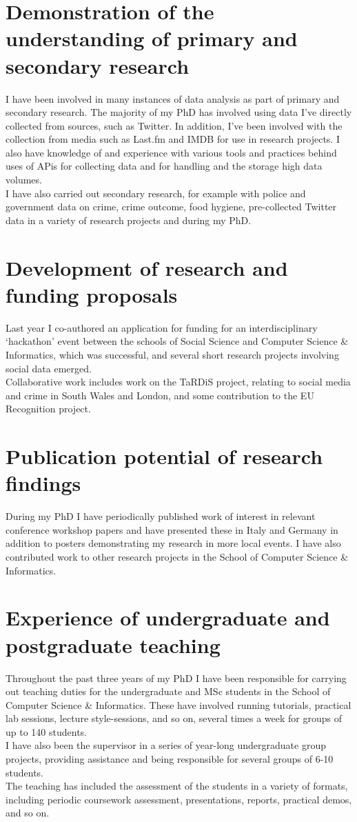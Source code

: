 \documentclass[10pt,a4paper]{article}
\begin{document}
\section*{Demonstration of the understanding of primary and secondary research}
I have been involved in many instances of data analysis as part of primary and secondary research. The majority of my PhD has involved using data I've directly collected from sources, such as Twitter. In addition, I've been involved with the collection from media such as Last.fm and IMDB for use in research projects. I also have knowledge of and experience with various tools and practices behind uses of APis for collecting data and for handling and the storage high data volumes.\\
I have also carried out secondary research, for example with police and government data on crime, crime outcome, food hygiene, pre-collected Twitter data in a variety of research projects and during my PhD.

\section*{Development of research and funding proposals}
Last year I co-authored an application for funding for an interdisciplinary `hackathon' event between the schools of Social Science and Computer Science \& Informatics, which was successful, and several short research projects involving social data emerged.\\
Collaborative work includes work on the TaRDiS project, relating to social media and crime in South Wales and London, and some contribution to the EU Recognition project.

\section*{Publication potential of research findings}
During my PhD I have periodically published work of interest in relevant conference workshop papers and have presented these in Italy and Germany in addition to posters demonstrating my research in more local events. I have also contributed work to other research projects in the School of Computer Science \& Informatics.

\section*{Experience of undergraduate and postgraduate teaching}
Throughout the past three years of my PhD I have been responsible for carrying out teaching duties for the undergraduate and MSc students in the School of Computer Science \& Informatics. These have involved running tutorials, practical lab sessions, lecture style-sessions, and so on, several times a week for groups of up to 140 students.\\
I have also been the supervisor in a series of year-long undergraduate group projects, providing assistance and being responsible for several groups of 6-10 students.\\
The teaching has included the assessment of the students in a variety of formats, including periodic coursework assessment, presentations, reports, practical demos, and so on.
\end{document}
